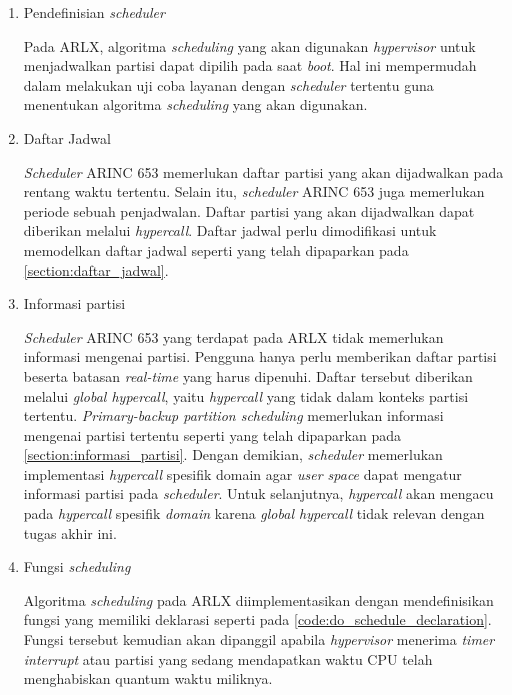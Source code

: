 \begin{enumerate}
	
	\item Pendefinisian \textit{scheduler}

		Pada ARLX, algoritma \textit{scheduling} yang akan digunakan \textit{hypervisor}
		untuk menjadwalkan partisi dapat dipilih pada saat \textit{boot}. Hal ini
		mempermudah dalam melakukan uji coba layanan dengan \textit{scheduler} tertentu
		guna menentukan algoritma \textit{scheduling} yang akan digunakan.

	\item Daftar Jadwal

		\textit{Scheduler} ARINC 653 memerlukan daftar partisi yang akan dijadwalkan
		pada rentang waktu tertentu. Selain itu, \textit{scheduler} ARINC 653 juga
		memerlukan periode sebuah penjadwalan. Daftar partisi yang akan dijadwalkan
		dapat diberikan melalui \textit{hypercall}. Daftar jadwal perlu dimodifikasi
		untuk memodelkan daftar jadwal seperti yang telah dipaparkan pada
		\autoref{section:daftar_jadwal}.
		
	\item Informasi partisi

		\textit{Scheduler} ARINC 653 yang terdapat pada ARLX tidak memerlukan informasi
		mengenai partisi. Pengguna hanya perlu memberikan daftar partisi beserta batasan
		\textit{real-time} yang harus dipenuhi. Daftar tersebut diberikan melalui
		\textit{global hypercall}, yaitu \textit{hypercall} yang tidak dalam konteks
		partisi tertentu. \textit{Primary-backup partition scheduling} memerlukan
		informasi mengenai partisi tertentu seperti yang telah dipaparkan pada
		\autoref{section:informasi_partisi}. Dengan demikian, \textit{scheduler}
		memerlukan implementasi \textit{hypercall} spesifik domain agar \textit{user
		space} dapat mengatur informasi partisi pada \textit{scheduler}. Untuk
		selanjutnya, \textit{hypercall} akan mengacu pada \textit{hypercall} spesifik
		\textit{domain} karena \textit{global hypercall} tidak relevan dengan tugas
		akhir ini.
		
	\item Fungsi \textit{scheduling}

		Algoritma \textit{scheduling} pada ARLX diimplementasikan dengan mendefinisikan
		fungsi yang memiliki deklarasi seperti pada
		\autoref{code:do_schedule_declaration}. Fungsi tersebut kemudian akan dipanggil
		apabila \textit{hypervisor} menerima \textit{timer interrupt} atau partisi yang
		sedang mendapatkan waktu CPU telah menghabiskan quantum waktu miliknya.

\end{enumerate}

